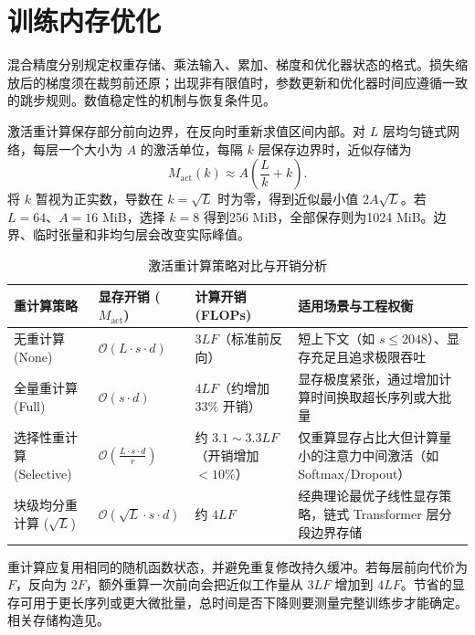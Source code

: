 \documentclass[../textbook.tex]{subfiles}
\begin{document}
\section{训练内存优化}

混合精度分别规定权重存储、乘法输入、累加、梯度和优化器状态的格式。损失缩放后的梯度须在裁剪前还原；出现非有限值时，参数更新和优化器时间应遵循一致的跳步规则。数值稳定性的机制与恢复条件见。

激活重计算保存部分前向边界，在反向时重新求值区间内部。对 $L$ 层均匀链式网络，每层一个大小为 $A$ 的激活单位，每隔 $k$ 层保存边界时，近似存储为
\begin{equation}
 M_{\mathrm{act}}(k)\approx A\left(\frac{L}{k}+k\right).
\end{equation}
将 $k$ 暂视为正实数，导数在 $k=\sqrt L$ 时为零，得到近似最小值 $2A\sqrt L$。若 $L=64$、$A=16$ MiB，选择 $k=8$ 得到256 MiB，全部保存则为1024 MiB。边界、临时张量和非均匀层会改变实际峰值。

\begin{table}[htbp]
  \centering
  \caption{激活重计算策略对比与开销分析}
  \label{tab:activation-checkpointing}
  \begin{tabularx}{\textwidth}{lp{28mm}p{30mm}X}
    \toprule
    重计算策略 & 显存开销 ($M_{\mathrm{act}}$) & 计算开销 (FLOPs) & 适用场景与工程权衡 \\
    \midrule
    无重计算 (None) & $\mathcal{O}(L \cdot s \cdot d)$ & $3LF$（标准前反向） & 短上下文（如 $s \le 2048$）、显存充足且追求极限吞吐 \\
    全量重计算 (Full) & $\mathcal{O}(s \cdot d)$ & $4LF$（约增加 $33\%$ 开销） & 显存极度紧张，通过增加计算时间换取超长序列或大批量 \\
    选择性重计算 (Selective) & $\mathcal{O}(\frac{L \cdot s \cdot d}{r})$ & 约 $3.1\sim 3.3LF$（开销增加 $<10\%$） & 仅重算显存占比大但计算量小的注意力中间激活（如 Softmax/Dropout） \\
    块级均分重计算 ($\sqrt{L}$) & $\mathcal{O}(\sqrt{L} \cdot s \cdot d)$ & 约 $4LF$ & 经典理论最优子线性显存策略，链式 Transformer 层分段边界存储 \\
    \bottomrule
  \end{tabularx}
\end{table}

重计算应复用相同的随机函数状态，并避免重复修改持久缓冲。若每层前向代价为 $F$，反向为 $2F$，额外重算一次前向会把近似工作量从 $3LF$ 增加到 $4LF$。节省的显存可用于更长序列或更大微批量，总时间是否下降则要测量完整训练步才能确定。相关存储构造见\autocite{chen2016sublinear}。
\end{document}
